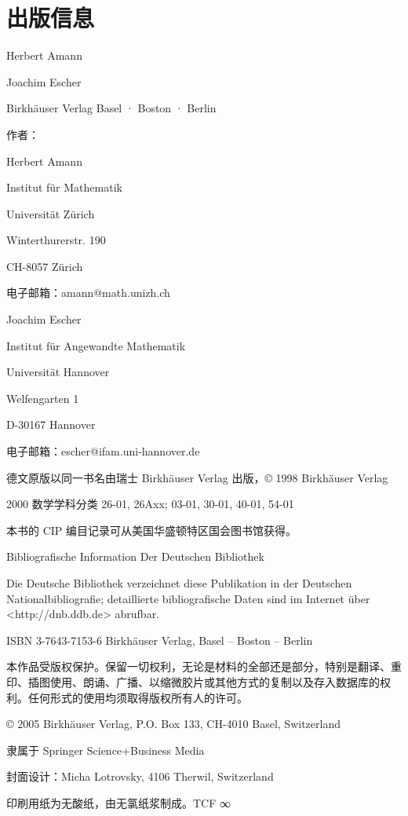 \chapter*{出版信息}

Herbert Amann

Joachim Escher

Birkhäuser Verlag Basel · Boston · Berlin

作者：

Herbert Amann

Institut für Mathematik

Universität Zürich

Winterthurerstr. 190

CH-8057 Zürich

电子邮箱：amann@math.unizh.ch

Joachim Escher

Institut für Angewandte Mathematik

Universität Hannover

Welfengarten 1

D-30167 Hannover

电子邮箱：escher@ifam.uni-hannover.de

德文原版以同一书名由瑞士 Birkhäuser Verlag 出版，© 1998 Birkhäuser Verlag

2000 数学学科分类 26-01, 26Axx; 03-01, 30-01, 40-01, 54-01

本书的 CIP 编目记录可从美国华盛顿特区国会图书馆获得。

Bibliografische Information Der Deutschen Bibliothek

Die Deutsche Bibliothek verzeichnet diese Publikation in der Deutschen Nationalbibliografie; detaillierte bibliografische Daten sind im Internet über <http://dnb.ddb.de> abrufbar.

ISBN 3-7643-7153-6 Birkhäuser Verlag, Basel – Boston – Berlin

本作品受版权保护。保留一切权利，无论是材料的全部还是部分，特别是翻译、重印、插图使用、朗诵、广播、以缩微胶片或其他方式的复制以及存入数据库的权利。任何形式的使用均须取得版权所有人的许可。

© 2005 Birkhäuser Verlag, P.O. Box 133, CH-4010 Basel, Switzerland

隶属于 Springer Science+Business Media

封面设计：Micha Lotrovsky, 4106 Therwil, Switzerland

印刷用纸为无酸纸，由无氯纸浆制成。TCF ∞

